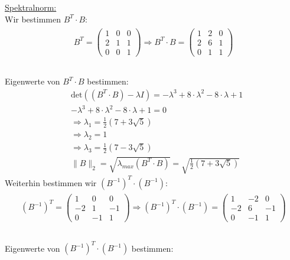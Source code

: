 \underline{Spektralnorm:}\\
Wir bestimmen $B^T\cdot B$:\\
\begin{align*}
\begin{split}
B^T =
\begin{pmatrix}
1 & 0 & 0\\
2 & 1 & 1\\
0 & 0 & 1
\end{pmatrix}
\Rightarrow B^T\cdot B=
\begin{pmatrix}
1 & 2 & 0\\
2 & 6 & 1\\
0 & 1 & 1
\end{pmatrix}\\
\end{split}
\end{align*}\\
Eigenwerte von $B^T\cdot B$ bestimmen:\\
\begin{align*}
&\mathrm{det}\left((B^T\cdot B)-\lambda I\right)=-\lambda^3+8\cdot\lambda^2-8\cdot\lambda+1\\
&-\lambda^3+8\cdot\lambda^2-8\cdot\lambda+1=0\\
&\Rightarrow \lambda_{1}=\frac{1}{2}(7+3\sqrt{5})\\
&\Rightarrow\lambda_{2}=1\\
&\Rightarrow\lambda_{3}=\frac{1}{2}(7-3\sqrt{5})\\
&\|B\|_2=\sqrt{\lambda_{max}(B^T\cdot B)}=\sqrt{\frac{1}{2}(7+3\sqrt{5})}
\end{align*}
Weiterhin bestimmen wir $(B^{-1})^T\cdot(B^{-1})$:\\
\begin{align*}
\begin{split}
(B^{-1})^T =
\begin{pmatrix}
1 & 0 & 0\\
-2 & 1 & -1\\
0 & -1 & 1
\end{pmatrix}
\Rightarrow (B^{-1})^T\cdot(B^{-1})=
\begin{pmatrix}
1 & -2 & 0\\
-2 & 6 & -1\\
0 & -1 & 1
\end{pmatrix}\\
\end{split}
\end{align*}\\
Eigenwerte von $(B^{-1})^T\cdot(B^{-1})$ bestimmen:\\
